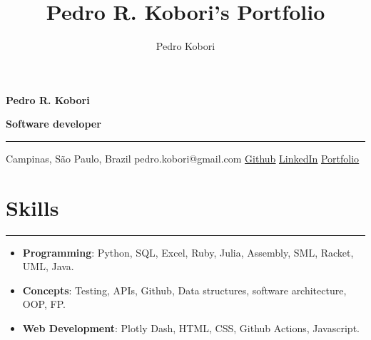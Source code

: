 \documentclass[a4paper,10pt]{article}
\title{Pedro R. Kobori's Portfolio}
\newcommand{\ulink}[2]{\href{#1}{\underline{#2}}}
\begin{document}
\date{}
\author{Pedro Kobori}

\noindent
\begin{minipage}[t]{0.5\textwidth}
  \begin{flushleft}
    \textbf{Pedro R. Kobori}
  \end{flushleft}
\end{minipage}
\begin{minipage}[t]{0.5\textwidth}
  \begin{flushright}
    \textbf{Software developer}
  \end{flushright}
\end{minipage}

\hrule

\vspace{2mm}
\noindent
{
  \centering
  Campinas, São Paulo, Brazil \textbar{}
  pedro.kobori@gmail.com \textbar{}
  \ulink{https://github.com/rokobo}{Github} \textbar{}
  \ulink{http://example.com}{LinkedIn} \textbar{}
  \ulink{http://example.com}{Portfolio}
  \par
}

\section*{Skills}
\hrule
\vspace{2mm}
\begin{itemize}[itemsep=0pt]
  \item \textbf{Programming}: Python, SQL, Excel, Ruby, Julia, Assembly, SML, Racket, UML, Java.
  \item \textbf{Concepts}: Testing, APIs, Github, Data structures, software architecture, OOP, FP.
  \item \textbf{Web Development}: Plotly Dash, HTML, CSS, Github Actions, Javascript.
\end{itemize}
\end{document}
